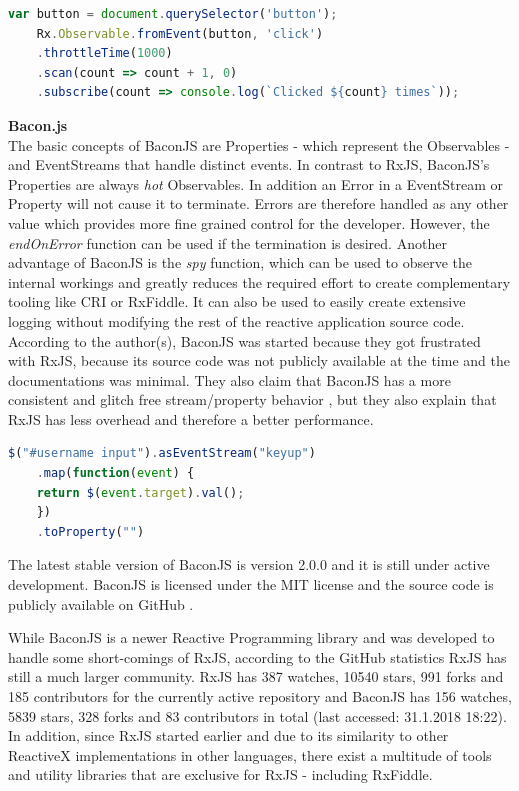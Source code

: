 	\begin{lstlisting}[language=JavaScript, caption={Example of RxJS code.},label={lst:Rx}]
	var button = document.querySelector('button');
	Rx.Observable.fromEvent(button, 'click')
	.throttleTime(1000)
	.scan(count => count + 1, 0)
	.subscribe(count => console.log(`Clicked ${count} times`));
	\end{lstlisting}
	
	\textbf{Bacon.js}\\
	The basic concepts of BaconJS \cite{BaconJS} are Properties - which represent the Observables - and EventStreams that handle distinct events. 
	In contrast to RxJS, BaconJS's Properties are always \emph{hot} Observables. In addition an Error in a EventStream or Property will not cause it to terminate. Errors are therefore handled as any other value which provides more fine grained control for the developer. However, the \emph{endOnError} function can be used if the termination is desired. 
	Another advantage of BaconJS is the \emph{spy} function, which can be used to observe the internal workings and greatly reduces the required effort to create complementary tooling like CRI or RxFiddle. It can also be used to easily create extensive logging without modifying the rest of the reactive application source code. According to the author(s), BaconJS was started because they got frustrated with RxJS, because its source code was not publicly available at the time and the documentations was minimal. They also claim that BaconJS has a more consistent and glitch free stream/property behavior \cite{BaconJSRepo}, but they also explain that RxJS has less overhead and therefore a better performance. 
		\begin{lstlisting}[language=JavaScript, caption={Example of BaconJS code.},label={lst:Bacon}]
	$("#username input").asEventStream("keyup")
	.map(function(event) {
	return $(event.target).val();
	})
	.toProperty("")
	\end{lstlisting}
	The latest stable version of BaconJS is version 2.0.0 and it is still under active development. BaconJS is licensed under the MIT license and the source code is publicly available on GitHub \cite{BaconJSRepo}.

	While BaconJS is a newer Reactive Programming library and was developed to handle some short-comings of RxJS, according to the GitHub statistics RxJS has still a much larger community. RxJS has 387 watches, 10540 stars, 991 forks and 185 contributors for the currently active repository and BaconJS has 156 watches, 5839 stars, 328 forks and 83 contributors in total (last accessed: 31.1.2018 18:22).
	In addition, since RxJS started earlier and due to its similarity to other ReactiveX implementations in other languages, there exist a multitude of tools and utility libraries that are exclusive for RxJS - including RxFiddle.

